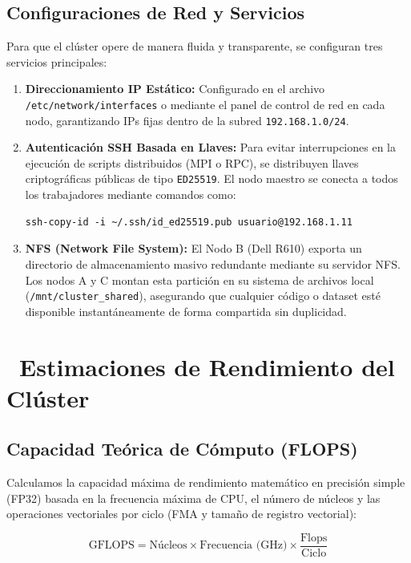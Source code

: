\documentclass[11pt,a4paper]{article}
\newcommand{\iconotexto}[2]{\textcolor{cyanNeon}{\faIcon{#1}}~#2}
\begin{document}
\subsection{Configuraciones de Red y Servicios}
Para que el clúster opere de manera fluida y transparente, se configuran tres servicios principales:
\begin{enumerate}
    \item \textbf{Direccionamiento IP Estático:} Configurado en el archivo \texttt{/etc/network/interfaces} o mediante el panel de control de red en cada nodo, garantizando IPs fijas dentro de la subred \texttt{192.168.1.0/24}.
    \item \textbf{Autenticación SSH Basada en Llaves:} Para evitar interrupciones en la ejecución de scripts distribuidos (MPI o RPC), se distribuyen llaves criptográficas públicas de tipo \texttt{ED25519}. El nodo maestro se conecta a todos los trabajadores mediante comandos como:
    \begin{lstlisting}
ssh-copy-id -i ~/.ssh/id_ed25519.pub usuario@192.168.1.11
    \end{lstlisting}
    \item \textbf{NFS (Network File System):} El Nodo B (Dell R610) exporta un directorio de almacenamiento masivo redundante mediante su servidor NFS. Los nodos A y C montan esta partición en su sistema de archivos local (\texttt{/mnt/cluster\_shared}), asegurando que cualquier código o dataset esté disponible instantáneamente de forma compartida sin duplicidad.
\end{enumerate}

\newpage
\section[Estimaciones de Rendimiento del Clúster]{\iconotexto{tachometer-alt}{Estimaciones de Rendimiento del Clúster}}

\subsection{Capacidad Teórica de Cómputo (FLOPS)}
Calculamos la capacidad máxima de rendimiento matemático en precisión simple (FP32) basada en la frecuencia máxima de CPU, el número de núcleos y las operaciones vectoriales por ciclo (FMA y tamaño de registro vectorial):

\begin{equation}
\text{GFLOPS} = \text{Núcleos} \times \text{Frecuencia (GHz)} \times \frac{\text{Flops}}{\text{Ciclo}}
\end{equation}
\end{document}

